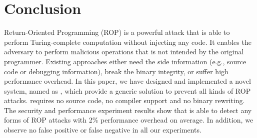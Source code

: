 \section{Conclusion} \label{sec:con}

Return-Oriented Programming (ROP) is a powerful attack that is able to perform Turing-complete computation without injecting any code. It enables the adversary to perform malicious operations that is not intended by the original programmer.
Existing approaches either need the side information (e.g., source code or debugging information), break the binary integrity, or suffer high performance overhead.
In this paper, we have designed and implemented a novel system, named as \name, which provide a generic solution to prevent all kinds of ROP attacks. \name requires no source code, no compiler support and no binary rewriting. The security and performance experiment results show that \name is able to detect any forms of ROP attacks with 2\% performance overhead on average. In addition, we observe no false positive or false negative in all our experiments.
